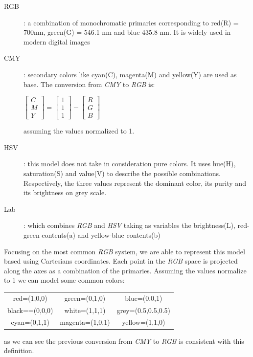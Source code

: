 \documentclass[../main.tex]{subfiles}
\begin{document}
\begin{description}
    \item[RGB]: a combination of monochromatic primaries corresponding to red(R) = 700nm,
    green(G) = 546.1 nm and blue 435.8 nm. It is widely used in modern digital images
    \item[CMY]: secondary colors like cyan(C), magenta(M) and yellow(Y) are used as base. The conversion from \textit{CMY} to \textit{RGB} is: 
    
    \begin{center}
    \begin{math}
    \begin{bmatrix}
    C \\ M \\ Y
    \end{bmatrix} = \begin{bmatrix}
    1 \\ 1 \\ 1
    \end{bmatrix} - 
    \begin{bmatrix}
    R \\ G \\ B
    \end{bmatrix}
    \end{math}
    \end{center}
    
    assuming the values normalized to 1.
    \item[HSV]: this model does not take in consideration pure colors. It uses hue(H), saturation(S) and value(V) to describe the possible combinations. Respectively, the three values represent the dominant color, its purity and its brightness on grey scale.
    \item[Lab]: which combines \textit{RGB} and \textit{HSV} taking as variables the brightness(L), red-green contents(a) and yellow-blue contents(b)
\end{description}

Focusing on the most common \textit{RGB} system,  we are able to represent this model based using Cartesians coordinates. Each point in the  \textit{RGB} space is projected along the axes as a combination of the primaries. Assuming the values normalize to 1 we can model some common colors:

\begin{center}
\begin{tabular}{ c c c }
 red=(1,0,0) & green=(0,1,0) & blue=(0,0,1) \\ 
 black==(0,0,0) & white=(1,1,1) & grey=(0.5,0.5,0.5) \\  
 cyan=(0,1,1) & magenta=(1,0,1) & yellow=(1,1,0)    
\end{tabular}
\end{center}
as we can see the previous conversion from \textit{CMY} to \textit{RGB} is consistent with this definition.
\end{document}
